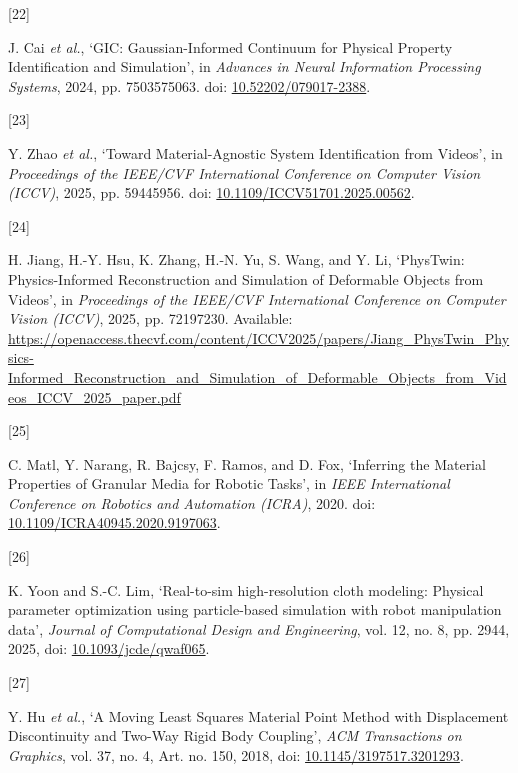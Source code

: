 \documentclass[
  11pt,
]{article}
\newlength{\cslhangindent}
\newlength{\csllabelwidth}
\newenvironment{CSLReferences}[2] %
 {\begin{list}{}{%
  \setlength{\itemindent}{0pt}
  \setlength{\leftmargin}{0pt}
  \setlength{\parsep}{0pt}
  \ifodd #1
   \setlength{\leftmargin}{\cslhangindent}
   \setlength{\itemindent}{-1\cslhangindent}
  \fi
  \setlength{\itemsep}{#2\baselineskip}}}
 {\end{list}}
\newcommand{\CSLLeftMargin}[1]{\parbox[t]{\csllabelwidth}{\strut#1\strut}}
\newcommand{\CSLRightInline}[1]{\parbox[t]{\linewidth - \csllabelwidth}{\strut#1\strut}}
\begin{document}
\begin{CSLReferences}{0}{0}
\CSLLeftMargin{{[}22{]} }%
\CSLRightInline{J. Cai \emph{et al.}, {`GIC: Gaussian-Informed Continuum
for Physical Property Identification and Simulation'}, in \emph{Advances
in Neural Information Processing Systems}, 2024, pp.
75035\textendash{}\allowbreak{}75063. doi:
\href{https://doi.org/10.52202/079017-2388}{10.52202/079017-2388}.}

\CSLLeftMargin{{[}23{]} }%
\CSLRightInline{Y. Zhao \emph{et al.}, {`Toward Material-Agnostic System
Identification from Videos'}, in \emph{Proceedings of the IEEE/CVF
International Conference on Computer Vision (ICCV)}, 2025, pp.
5944\textendash{}\allowbreak{}5956. doi:
\href{https://doi.org/10.1109/ICCV51701.2025.00562}{10.1109/ICCV51701.2025.00562}.}

\CSLLeftMargin{{[}24{]} }%
\CSLRightInline{H. Jiang, H.-Y. Hsu, K. Zhang, H.-N. Yu, S. Wang, and Y.
Li, {`PhysTwin: Physics-Informed Reconstruction and Simulation of
Deformable Objects from Videos'}, in \emph{Proceedings of the IEEE/CVF
International Conference on Computer Vision (ICCV)}, 2025, pp.
7219\textendash{}\allowbreak{}7230. Available:
\url{https://openaccess.thecvf.com/content/ICCV2025/papers/Jiang_PhysTwin_Physics-Informed_Reconstruction_and_Simulation_of_Deformable_Objects_from_Videos_ICCV_2025_paper.pdf}}

\CSLLeftMargin{{[}25{]} }%
\CSLRightInline{C. Matl, Y. Narang, R. Bajcsy, F. Ramos, and D. Fox,
{`Inferring the Material Properties of Granular Media for Robotic
Tasks'}, in \emph{IEEE International Conference on Robotics and
Automation (ICRA)}, 2020. doi:
\href{https://doi.org/10.1109/ICRA40945.2020.9197063}{10.1109/ICRA40945.2020.9197063}.}

\CSLLeftMargin{{[}26{]} }%
\CSLRightInline{K. Yoon and S.-C. Lim, {`Real-to-sim high-resolution
cloth modeling: Physical parameter optimization using particle-based
simulation with robot manipulation data'}, \emph{Journal of
Computational Design and Engineering}, vol. 12, no. 8, pp.
29\textendash{}\allowbreak{}44, 2025, doi:
\href{https://doi.org/10.1093/jcde/qwaf065}{10.1093/jcde/qwaf065}.}

\CSLLeftMargin{{[}27{]} }%
\CSLRightInline{Y. Hu \emph{et al.}, {`A Moving Least Squares Material
Point Method with Displacement Discontinuity and Two-Way Rigid Body
Coupling'}, \emph{ACM Transactions on Graphics}, vol. 37, no. 4, Art.
no. 150, 2018, doi:
\href{https://doi.org/10.1145/3197517.3201293}{10.1145/3197517.3201293}.}


\end{CSLReferences}
\end{document}
